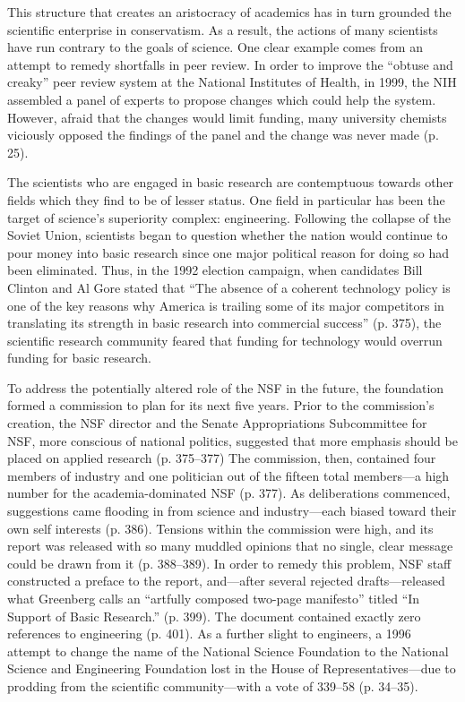 \documentclass{article}[12pt]
\begin{document}
This structure that creates an aristocracy of academics has in turn grounded
the scientific enterprise in conservatism. As a result, the actions of many
scientists have run contrary to the goals of science. One clear example comes
from an attempt to remedy shortfalls in peer review. In order to improve the
``obtuse and creaky'' peer review system at the National Institutes of Health,
in 1999, the NIH assembled a panel of experts to propose changes which could
help the system. However, afraid that the changes would limit funding, many
university chemists viciously opposed the findings of the panel and the change
was never made (p. 25).

The scientists who are engaged in basic research are contemptuous towards other
fields which they find to be of lesser status. One field in particular has been
the target of science's superiority complex: engineering. Following the
collapse of the Soviet Union, scientists began to question whether the nation
would continue to pour money into basic research since one major political
reason for doing so had been eliminated. Thus, in the 1992 election campaign,
when candidates Bill Clinton and Al Gore stated that ``The absence of a
coherent technology policy is one of the key reasons why America is trailing
some of its major competitors in translating its strength in basic research
into commercial success'' (p. 375), the scientific research community
feared that funding for technology would overrun funding for basic research. 

To address the potentially altered role of the NSF in the future, the
foundation formed a commission to plan for its next five years. Prior to the
commission's creation, the NSF director and the Senate Appropriations
Subcommittee for NSF, more conscious of national politics, suggested that more
emphasis should be placed on applied research (p. 375--377) The commission,
then, contained four members of industry and one politician out of the fifteen
total members---a high number for the academia-dominated NSF (p. 377). As
deliberations commenced, suggestions came flooding in from science and
industry---each biased toward their own self interests (p. 386). Tensions
within the commission were high, and its report was released with so many
muddled opinions that no single, clear message could be drawn from it (p.
388--389). In order to remedy this problem, NSF staff constructed a preface to
the report, and---after several rejected drafts---released what Greenberg calls
an ``artfully composed two-page manifesto'' titled ``In Support of Basic
Research.'' (p. 399). The document contained exactly zero references to
engineering (p. 401). As a further slight to engineers, a 1996 attempt to
change the name of the National Science Foundation to the National Science and
Engineering Foundation lost in the House of Representatives---due to prodding
from the scientific community---with a vote of 339--58 (p. 34--35).
\end{document}
